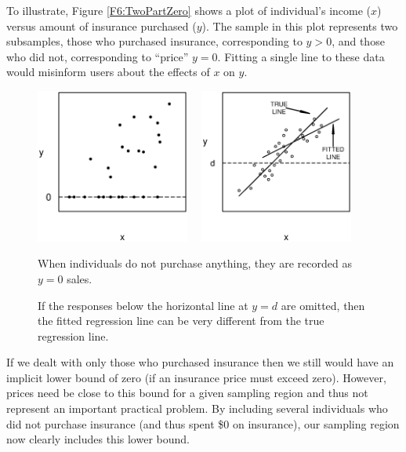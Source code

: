 To illustrate, Figure \ref{F6:TwoPartZero} shows a plot of
individual's income ($x$) versus amount of insurance purchased
($y$). The sample in this plot represents two subsamples, those who
purchased insurance, corresponding to $y>0$, and those who did not,
corresponding to ``price'' $y=0$. Fitting a single line to these
data would misinform users about the effects of $x$ on $y$.


\begin{figure}[htp]
    \includegraphics[width=0.45\textwidth]{Chapter6/F6TwoPartZero.eps}   \hfill
    $~~~$
    \includegraphics[width=0.45\textwidth]{Chapter6/F6TruncateRegr.eps}
      \parbox[t]{2.5in}{\caption{\label{F6:TwoPartZero}
      \small  When individuals do not purchase anything, they are recorded as $y=0$ sales.}}
\hfill
        \parbox[t]{2.5in}{\caption{\label{F6:TruncateRegr} \small  If the responses below
the horizontal line at $y=d$ are omitted, then the fitted regression
line can be very different from the true regression line.}}
\end{figure}


If we dealt with only those who purchased insurance then we still
would have an implicit lower bound of zero (if an insurance price
must exceed zero). However, prices need be close to this bound for a
given sampling region and thus not represent an important practical
problem. By including several individuals who did not purchase
insurance (and thus spent \$0 on insurance), our sampling region now
clearly includes this lower bound.

